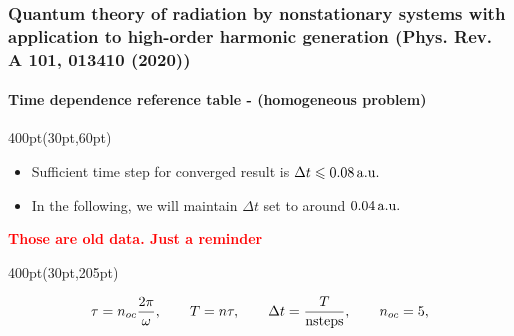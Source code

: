 

\begin{frame}
\frametitle{Quantum theory of radiation by nonstationary systems 
	with application to high-order harmonic generation
        (Phys. Rev. A 101, 013410 (2020))}
	\framesubtitle{Time dependence reference table - (homogeneous problem)}
\small

\begin{textblock*}{400pt}(30pt,60pt)
\footnotesize
\begin{itemize}
\item Sufficient time step for converged result is 
$\Delta t \leqslant 0.08\,\rm a.u.$
\item In the following, we will maintain $\Delta t$ set to 
around $0.04\,\rm a.u.$
\end{itemize}


	\textcolor{red}{\textbf{Those are old data. Just a reminder}}\\

\end{textblock*}

{
\tiny 

}


\begin{textblock*}{400pt}(30pt,205pt)
\scriptsize

\begin{align}
    \tau = n_{oc}\frac{2\pi}{\omega}, \hspace{20pt}
    T = n \tau, \hspace{20pt}
    \Delta t  = \frac{T}{{\rm nsteps}}, \hspace{20pt}
    n_{oc}  = 5,
                \nonumber
\end{align}

\end{textblock*}

\end{frame}




